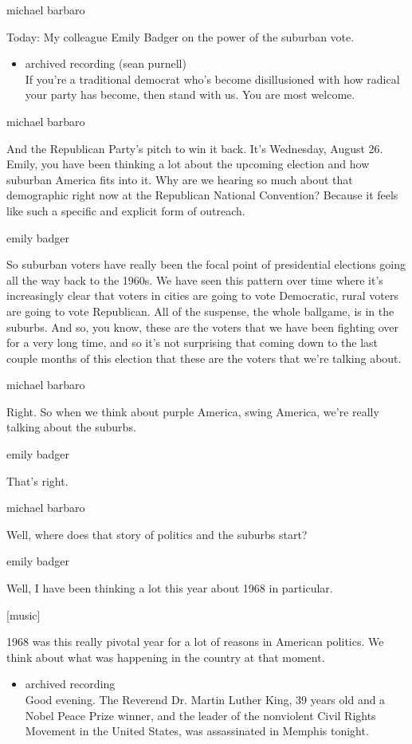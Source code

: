 michael barbaro

Today: My colleague Emily Badger on the power of the suburban vote.

\begin{itemize}
\tightlist
\item
  archived recording (sean purnell)\\
  If you're a traditional democrat who's become disillusioned with how
  radical your party has become, then stand with us. You are most
  welcome.
\end{itemize}

michael barbaro

And the Republican Party's pitch to win it back. It's Wednesday, August
26. Emily, you have been thinking a lot about the upcoming election and
how suburban America fits into it. Why are we hearing so much about that
demographic right now at the Republican National Convention? Because it
feels like such a specific and explicit form of outreach.

emily badger

So suburban voters have really been the focal point of presidential
elections going all the way back to the 1960s. We have seen this pattern
over time where it's increasingly clear that voters in cities are going
to vote Democratic, rural voters are going to vote Republican. All of
the suspense, the whole ballgame, is in the suburbs. And so, you know,
these are the voters that we have been fighting over for a very long
time, and so it's not surprising that coming down to the last couple
months of this election that these are the voters that we're talking
about.

michael barbaro

Right. So when we think about purple America, swing America, we're
really talking about the suburbs.

emily badger

That's right.

michael barbaro

Well, where does that story of politics and the suburbs start?

emily badger

Well, I have been thinking a lot this year about 1968 in particular.

{[}music{]}

1968 was this really pivotal year for a lot of reasons in American
politics. We think about what was happening in the country at that
moment.

\begin{itemize}
\tightlist
\item
  archived recording\\
  Good evening. The Reverend Dr. Martin Luther King, 39 years old and a
  Nobel Peace Prize winner, and the leader of the nonviolent Civil
  Rights Movement in the United States, was assassinated in Memphis
  tonight.
\end{itemize}

